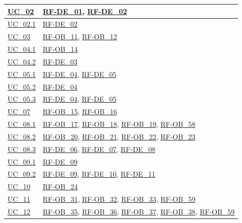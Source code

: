 \begin{longtable}{|>{\raggedright}p{}|>{\raggedright\arraybackslash}p{}|}
    \hline
    \hyperref[uc_02]{UC\_02} & \hyperlink{rf-de_1}{RF-DE\_01}, \hyperlink{rf-de_2}{RF-DE\_02} \\
    \hline
    \hyperref[uc_02.1]{UC\_02.1} & \hyperlink{rf-de_2}{RF-DE\_02} \\
    \hline
    \hyperref[uc_03]{UC\_03} & \hyperlink{rf-ob_11}{RF-OB\_11}, \hyperlink{rf-ob_12}{RF-OB\_12} \\
    \hline
    \hyperref[uc_04.1]{UC\_04.1} & \hyperlink{rf-ob_14}{RF-OB\_14} \\
    \hline
    \hyperref[uc_04.2]{UC\_04.2} & \hyperlink{rf-de_3}{RF-DE\_03} \\
    \hline
    \hyperref[uc_05.1]{UC\_05.1} & \hyperlink{rf-de_4}{RF-DE\_04}, \hyperlink{rf-de_5}{RF-DE\_05} \\
    \hline
    \hyperref[uc_05.2]{UC\_05.2} & \hyperlink{rf-de_4}{RF-DE\_04} \\
    \hline
    \hyperref[uc_05.3]{UC\_05.3} & \hyperlink{rf-de_4}{RF-DE\_04}, \hyperlink{rf-de_5}{RF-DE\_05} \\
    \hline
    \hyperref[uc_07]{UC\_07} & \hyperlink{rf-ob_15}{RF-OB\_15}, \hyperlink{rf-ob_16}{RF-OB\_16} \\
    \hline
    \hyperref[uc_08.1]{UC\_08.1} & \hyperlink{rf-ob_17}{RF-OB\_17}, \hyperlink{rf-ob_18}{RF-OB\_18}, \hyperlink{rf-ob_19}{RF-OB\_19}, \hyperlink{rf-ob_58}{RF-OB\_58} \\
    \hline
    \hyperref[uc_08.2]{UC\_08.2} & \hyperlink{rf-ob_20}{RF-OB\_20}, \hyperlink{rf-ob_21}{RF-OB\_21}, \hyperlink{rf-ob_22}{RF-OB\_22}, \hyperlink{rf-ob_23}{RF-OB\_23} \\
    \hline
    \hyperref[uc_08.3]{UC\_08.3} & \hyperlink{rf-de_6}{RF-DE\_06}, \hyperlink{rf-de_7}{RF-DE\_07}, \hyperlink{rf-de_8}{RF-DE\_08} \\
    \hline
    \hyperref[uc_09.1]{UC\_09.1} & \hyperlink{rf-de_9}{RF-DE\_09} \\
    \hline
    \hyperref[uc_09.2]{UC\_09.2} & \hyperlink{rf-de_9}{RF-DE\_09}, \hyperlink{rf-de_10}{RF-DE\_10}, \hyperlink{rf-de_11}{RF-DE\_11} \\
    \hline
    \hyperref[uc_10]{UC\_10} & \hyperlink{rf-ob_24}{RF-OB\_24} \\
    \hline
    \hyperref[uc_11]{UC\_11} & \hyperlink{rf-ob_31}{RF-OB\_31}, \hyperlink{rf-ob_32}{RF-OB\_32}, \hyperlink{rf-ob_33}{RF-OB\_33}, \hyperlink{rf-ob_59}{RF-OB\_59} \\
    \hline
    \hyperref[uc_12]{UC\_12} & \hyperlink{rf-ob_35}{RF-OB\_35}, \hyperlink{rf-ob_36}{RF-OB\_36}, \hyperlink{rf-ob_37}{RF-OB\_37}, \hyperlink{rf-ob_38}{RF-OB\_38}, \hyperlink{rf-ob_59}{RF-OB\_59} \\

\end{longtable}
